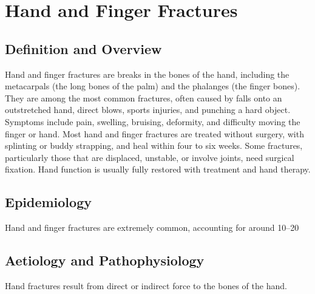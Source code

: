 \chapter{Hand and Finger Fractures}

\section*{Definition and Overview}
Hand and finger fractures are breaks in the bones of the hand, including the metacarpals (the long bones of the palm) and the phalanges (the finger bones). They are among the most common fractures, often caused by falls onto an outstretched hand, direct blows, sports injuries, and punching a hard object. Symptoms include pain, swelling, bruising, deformity, and difficulty moving the finger or hand. Most hand and finger fractures are treated without surgery, with splinting or buddy strapping, and heal within four to six weeks. Some fractures, particularly those that are displaced, unstable, or involve joints, need surgical fixation. Hand function is usually fully restored with treatment and hand therapy.

\section*{Epidemiology}
Hand and finger fractures are extremely common, accounting for around 10--20%

\section*{Aetiology and Pathophysiology}
Hand fractures result from direct or indirect force to the bones of the hand.

